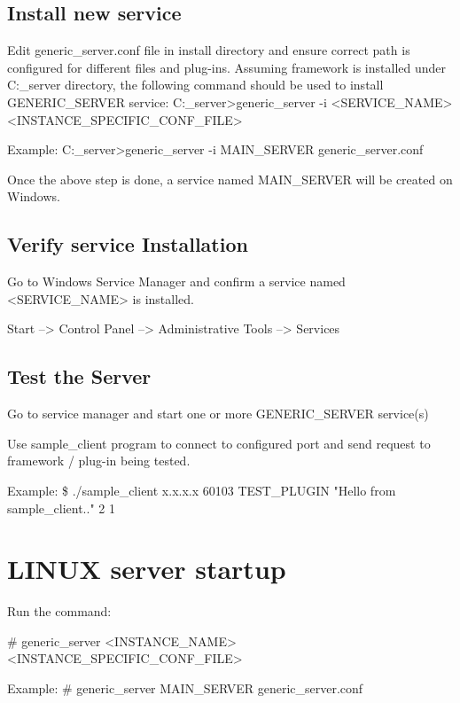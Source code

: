 \hypertarget{index_IS}{}\subsection{Install new service}\label{index_IS}
\begin{DoxyVerb}     Edit generic_server.conf file in install directory and ensure correct path is configured for different files and plug-ins.
 Assuming framework is installed under C:\generic_server directory, the following command should be used to install GENERIC_SERVER
 service:
     C:\generic_server>generic_server -i <SERVICE_NAME> <INSTANCE_SPECIFIC_CONF_FILE>

     Example:
     C:\generic_server>generic_server -i MAIN_SERVER  generic_server.conf

  Once the above step is done, a service named MAIN_SERVER will be created on Windows.
\end{DoxyVerb}
\hypertarget{index_VE}{}\subsection{Verify service Installation}\label{index_VE}
\begin{DoxyVerb}  Go to Windows Service Manager and confirm a service named <SERVICE_NAME> is installed.

  Start --> Control Panel --> Administrative Tools --> Services
\end{DoxyVerb}
\hypertarget{index_TE}{}\subsection{Test the Server}\label{index_TE}
\begin{DoxyItemize}
\item Go to service manager and start one or more G\-E\-N\-E\-R\-I\-C\-\_\-\-S\-E\-R\-V\-E\-R service(s) \item Use sample\-\_\-client program to connect to configured port and send request to framework / plug-\/in being tested. 
\begin{DoxyPre}
        Example:
        \$ ./sample\_client x.x.x.x 60103 TEST\_PLUGIN "Hello from sample\_client.." 2 1
\end{DoxyPre}
 \end{DoxyItemize}
\hypertarget{index_LI}{}\section{L\-I\-N\-U\-X server startup}\label{index_LI}
\begin{DoxyVerb}    Run the command:

    # generic_server <INSTANCE_NAME> <INSTANCE_SPECIFIC_CONF_FILE>

    Example:
    # generic_server MAIN_SERVER generic_server.conf
\end{DoxyVerb}


